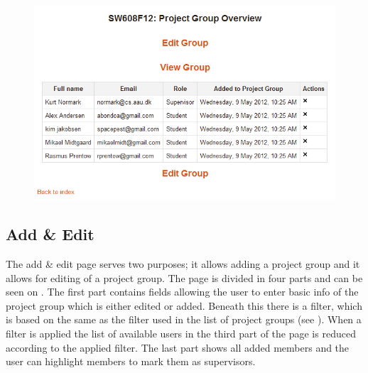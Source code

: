 \begin{figure}
	\centering
		\includegraphics[width=\textwidth]{images/moodleprojectgroupoverview.png}
	\label{fig:moodlepoverview}
\end{figure}
\FloatBarrier

\subsection{Add \& Edit}
\label{sec:addandedit}
The add \& edit page serves two purposes; it allows adding a project group and it allows for editing of a project group.
The page is divided in four parts and can be seen on . 
The first part contains fields allowing the user to enter basic info of the project group which is either edited or added. 
Beneath this there is a filter, which is based on the same as the filter used in the list of project groups (see ). 
When a filter is applied the list of available users in the third part of the page is reduced according to the applied filter. 
The last part shows all added members and the user can highlight members to mark them as supervisors. 


